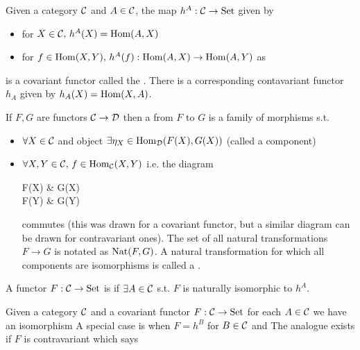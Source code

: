 \documentclass{article}
\begin{document}
\begin{example}
Given a category $\mathcal{C}$ and $A \in \mathcal{C}$, the map $h^A :\mathcal{C} \to \text{Set}$ given by 
\begin{itemize}
	\item for $X \in \mathcal{C}, \, h^A(X) = \operatorname{Hom}(A,X)$
	\item for $f \in \operatorname{Hom}(X,Y), \, h^A(f):\operatorname{Hom}(A,X) \to \operatorname{Hom}(A,Y)$ as 
\end{itemize}
is a covariant functor called the . There is a corresponding contavariant functor $h_A$ given by $h_A(X) = \operatorname{Hom}(X,A)$.
\end{example}

\begin{definition}
	If $F,G$ are functors $\mathcal{C} \to \mathcal{D}$ then a  from $F$ to $G$ is a family of morphisms s.t. 
	\begin{itemize}
		\item $\forall X \in \mathcal{C}$ and object $\exists \eta_X \in \operatorname{Hom}_{\mathcal{D}}(F(X),G(X))$ (called a component)
		\item $\forall X,Y \in \mathcal{C}, \, f \in \operatorname{Hom}_{\mathcal{C}}(X,Y)$
i.e. the diagram 
\begin{tkz}
	F(X) \arrow[r,"\eta_X"] \arrow[d,"F(Y)"'] & G(X) \arrow[d,"G(f)"] \\
	F(Y) \arrow[r,"\eta_Y"'] & G(Y)
\end{tkz}
commutes (this was drawn for a covariant functor, but a similar diagram can be drawn for contravariant ones). The set of all natural transformations $F \to G$ is notated as $\operatorname{Nat}(F,G)$. A natural transformation for which all components are isomorphisms is called a .
	\end{itemize}
\end{definition}

\begin{definition}
	A functor $F:\mathcal{C} \to \text{Set}$ is  if $\exists A \in \mathcal{C}$ s.t. $F$ is naturally isomorphic to $h^A$.
\end{definition}

\begin{lemma}
Given a category $\mathcal{C}$ and a covariant functor $F:\mathcal{C} \to \text{Set}$ for each $A \in \mathcal{C}$ we have an isomorphism 
A special case is when $F = h^B$ for $B \in \mathcal{C}$ and 
The analogue exists if $F$ is contravariant which says 
\end{lemma}
\end{document}
